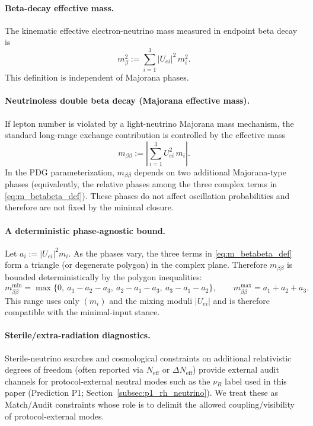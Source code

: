 \paragraph{Beta-decay effective mass.}
The kinematic effective electron-neutrino mass measured in endpoint beta decay is
\begin{equation}\label{eq:m_beta_def}
m_\beta^2 := \sum_{i=1}^3 |U_{ei}|^2\,m_i^2.
\end{equation}
This definition is independent of Majorana phases.

\paragraph{Neutrinoless double beta decay (Majorana effective mass).}
If lepton number is violated by a light-neutrino Majorana mass mechanism,
the standard long-range exchange contribution is controlled by the effective mass
\begin{equation}\label{eq:m_betabeta_def}
m_{\beta\beta} := \left|\sum_{i=1}^3 U_{ei}^2\,m_i\right|.
\end{equation}
In the PDG parameterization, $m_{\beta\beta}$ depends on two additional Majorana-type phases
(equivalently, the relative phases among the three complex terms in \eqref{eq:m_betabeta_def}).
These phases do not affect oscillation probabilities and therefore are not fixed by the minimal closure.

\paragraph{A deterministic phase-agnostic bound.}
Let $a_i:=|U_{ei}|^2 m_i$.
As the phases vary, the three terms in \eqref{eq:m_betabeta_def} form a triangle (or degenerate polygon) in the complex plane.
Therefore $m_{\beta\beta}$ is bounded deterministically by the polygon inequalities:
\begin{equation}\label{eq:m_betabeta_bounds}
m_{\beta\beta}^{\min}=\max\{0,\ a_1-a_2-a_3,\ a_2-a_1-a_3,\ a_3-a_1-a_2\},
\qquad
m_{\beta\beta}^{\max}=a_1+a_2+a_3.
\end{equation}
This range uses only $(m_i)$ and the mixing moduli $|U_{ei}|$ and is therefore compatible with the minimal-input stance.

\paragraph{Sterile/extra-radiation diagnostics.}
Sterile-neutrino searches and cosmological constraints on additional relativistic degrees of freedom
(often reported via $N_\mathrm{eff}$ or $\Delta N_\mathrm{eff}$) provide external audit channels for
protocol-external neutral modes such as the $\nu_R$ label used in this paper (Prediction P1; Section~\ref{subsec:p1_rh_neutrino}).
We treat these as Match/Audit constraints whose role is to delimit the allowed coupling/visibility of protocol-external modes.

